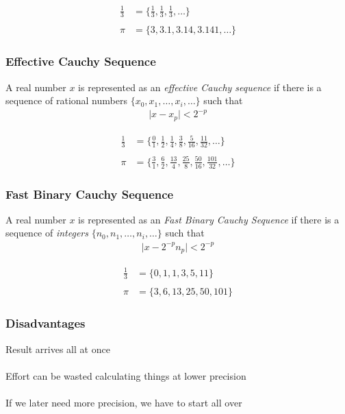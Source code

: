 \documentclass[11pt,aspectratio=169]{beamer}
\begin{document}
\begin{frame}
\begin{align*}
\frac{1}{3} &= \{\frac{1}{3}, \frac{1}{3}, \frac{1}{3}, \dots\} \\
~\\
\pi &= \{3, 3.1, 3.14, 3.141, \dots\}
\end{align*}
\end{frame}

\begin{frame}
\frametitle{Effective Cauchy Sequence}
\begin{definition}
A real number $x$ is represented as an \emph{effective Cauchy sequence} if
there is a sequence of rational numbers $\{x_0, x_1, \dots, x_i,
\dots\}$ such that
\begin{align*}
\vert x - x_p \vert < 2^{-p}
\end{align*}
\end{definition}
\begin{align*}
\frac{1}{3} &= \{\frac{0}{1}, \frac{1}{2}, \frac{1}{4}, \frac{3}{8}, \frac{5}{16}, \frac{11}{32}, \dots\}\\
~\\
\pi &= \{\frac{3}{1}, \frac{6}{2}, \frac{13}{4}, \frac{25}{8}, \frac{50}{16}, \frac{101}{32}, \dots\}
\end{align*}
\end{frame}

\begin{frame}
\frametitle{Fast Binary Cauchy Sequence}
\begin{definition}
A real number $x$ is represented as an \emph{Fast Binary Cauchy Sequence} if
there is a sequence of \emph{integers} $\{n_0, n_1, \dots, n_i, \dots\}$ such that
\begin{align*}
\vert x - 2^{-p}n_p \vert < 2^{-p}
\end{align*}
\end{definition}
\begin{align*}
\frac{1}{3} &= \{0, 1, 1, 3, 5, 11 \} \\
~\\
\pi &= \{3, 6, 13, 25, 50, 101 \}
\end{align*}
\end{frame}


\begin{frame}
\frametitle{Disadvantages}
Result arrives all at once
\\~\\
Effort can be wasted calculating things at lower precision
\\~\\
If we later need more precision, we have to start all over
\end{frame}
\end{document}
